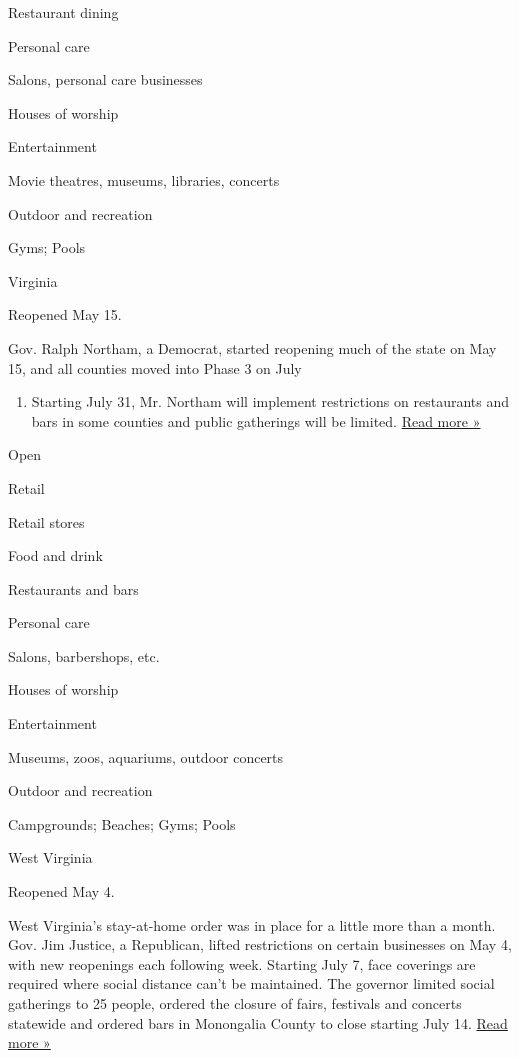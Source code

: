 Restaurant dining

Personal care

Salons, personal care businesses

Houses of worship

Entertainment

Movie theatres, museums, libraries, concerts

Outdoor and recreation

Gyms; Pools

Virginia

Reopened May 15.

Gov. Ralph Northam, a Democrat, started reopening much of the state on
May 15, and all counties moved into Phase 3 on July

\begin{enumerate}
\def\labelenumi{\arabic{enumi}.}
\tightlist
\item
  Starting July 31, Mr. Northam will implement restrictions on
  restaurants and bars in some counties and public gatherings will be
  limited.
  \href{https://www.wsls.com/news/2020/06/30/bar-seating-will-be-prohibited-in-virginia-restaurants-during-phase-3-gov-northam-says/}{Read
  more »}
\end{enumerate}

Open

Retail

Retail stores

Food and drink

Restaurants and bars

Personal care

Salons, barbershops, etc.

Houses of worship

Entertainment

Museums, zoos, aquariums, outdoor concerts

Outdoor and recreation

Campgrounds; Beaches; Gyms; Pools

West Virginia

Reopened May 4.

West Virginia's stay-at-home order was in place for a little more than a
month. Gov. Jim Justice, a Republican, lifted restrictions on certain
businesses on May 4, with new reopenings each following week. Starting
July 7, face coverings are required where social distance can't be
maintained. The governor limited social gatherings to 25 people, ordered
the closure of fairs, festivals and concerts statewide and ordered bars
in Monongalia County to close starting July 14.
\href{https://www.wvnstv.com/top-stories/coming-soon-wv-covid-19-update-july-13-2020/}{Read
more »}

